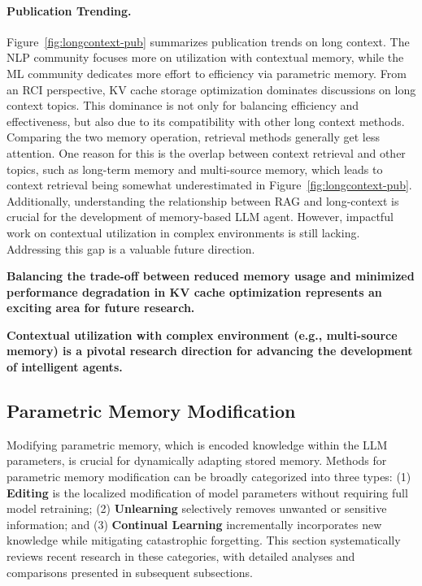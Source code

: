 \documentclass[manuscript,screen]{acmart}
\begin{document}
\paragraph{Publication Trending.} Figure~\ref{fig:longcontext-pub} summarizes publication trends on long context. The NLP community focuses more on utilization with contextual memory, while the ML community dedicates more effort to efficiency via parametric memory. From an RCI perspective, KV cache storage optimization dominates discussions on long context topics. This dominance is not only for balancing efficiency and effectiveness, but also due to its compatibility with other long context methods. Comparing the two memory operation, retrieval methods generally get less attention. One reason for this is the overlap between context retrieval and other topics, such as long-term memory and multi-source memory, which leads to context retrieval being somewhat underestimated in Figure~\ref{fig:longcontext-pub}. Additionally, understanding the relationship between RAG and long-context \citep{li-etal-2024-retrieval, jin2025longcontext} is crucial for the development of memory-based LLM agent. However, impactful work on contextual utilization in complex environments is still lacking. Addressing this gap is a valuable future direction.

\begin{tcolorbox}[
    colback=longcontextcolor!30!white,
    colframe=black!50,
    arc=6pt,
    boxrule=0.8pt,
    width=\linewidth,
    enhanced,
    left=4pt,
    right=4pt,
    top=4pt,
    bottom=4pt,
    fontupper=\small\bfseries
]
\lightbulb \textbf{Balancing the trade-off between reduced memory usage and minimized performance degradation in KV cache optimization represents an exciting area for future research.} 

\lightbulb \textbf{Contextual utilization with complex environment (e.g., multi-source memory) is a pivotal research direction for advancing the development of intelligent agents.}

\end{tcolorbox}


\subsection{Parametric Memory Modification}
Modifying parametric memory, which is encoded knowledge within the LLM parameters, is crucial for dynamically adapting stored memory. Methods for parametric memory modification can be broadly categorized into three types: (1) \textbf{Editing} is the localized modification of model parameters without requiring full model retraining; (2) \textbf{Unlearning} selectively removes unwanted or sensitive information; and (3) \textbf{Continual Learning} incrementally incorporates new knowledge while mitigating catastrophic forgetting. This section systematically reviews recent research in these categories, with detailed analyses and comparisons presented in subsequent subsections.
\end{document}
